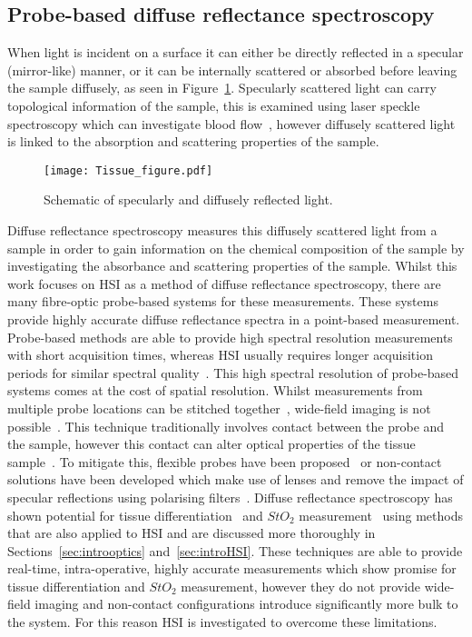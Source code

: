 \subsection{Probe-based diffuse reflectance spectroscopy}
When light is incident on a surface it can either be directly reflected in a specular (mirror-like) manner, or it can be internally scattered or absorbed before leaving the sample diffusely, as seen in Figure~\ref{fig:diffuseR}. Specularly scattered light can carry topological information of the sample, this is examined using laser speckle spectroscopy which can investigate blood flow~\citep{Dunn2012}, however diffusely scattered light is linked to the absorption and scattering properties of the sample. 
\begin{figure}[h]
    \centering
    \texttt{[image: Tissue\_figure.pdf]}
    \caption{Schematic of specularly and diffusely reflected light.}
    \label{fig:diffuseR}
\end{figure}
Diffuse reflectance spectroscopy measures this diffusely scattered light from a sample in order to gain information on the chemical composition of the sample by investigating the absorbance and scattering properties of the sample. Whilst this work focuses on HSI as a method of diffuse reflectance spectroscopy, there are many fibre-optic probe-based systems for these measurements. These systems provide highly accurate diffuse reflectance spectra in a point-based measurement. Probe-based methods are able to provide high spectral resolution measurements with short acquisition times, whereas HSI usually requires longer acquisition periods for similar spectral quality~\citep{Dinish2017}. This high spectral resolution of probe-based systems comes at the cost of spatial resolution. Whilst measurements from multiple probe locations can be stitched together~\citep{Thrapp2020}, wide-field imaging is not possible~\citep{Nishidate2015}. This technique traditionally involves contact between the probe and the sample, however this contact can alter optical properties of the tissue sample~\citep{Miller2017}. To mitigate this, flexible probes have been proposed~\citep{Miller2017} or non-contact solutions have been developed which make use of lenses and remove the impact of specular reflections using polarising filters~\citep{Bish2011, Zhu2012}. %
Diffuse reflectance spectroscopy has shown potential for tissue differentiation~\citep{Skyrman2022} and $StO_2$ measurement~\citep{Fredriksson2020} using methods that are also applied to HSI and are discussed more thoroughly in Sections~\ref{sec:introoptics} and~\ref{sec:introHSI}. These techniques are able to provide real-time, intra-operative, highly accurate measurements which show promise for tissue differentiation and $StO_2$ measurement, however they do not provide wide-field imaging and non-contact configurations introduce significantly more bulk to the system. For this reason HSI is investigated to overcome these limitations. 

